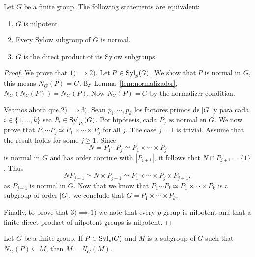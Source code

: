 \begin{theorem}
	\label{thm:nilpotente:eq}
	Let $G$ be a finite group. The following statements are equivalent: 
	\begin{enumerate}
		\item $G$ is nilpotent.
		\item Every Sylow subgroup of $G$ is normal.
		\item $G$ is the direct product of its Sylow subgroups. 
	\end{enumerate}
\end{theorem}

\begin{proof}
	We prove that $1)\implies 2)$. Let $P\in\mathrm{Syl}_p(G)$. We show that $P$ is normal in $G$, this means 
	$N_G(P)=G$. By Lemma~\ref{lem:normalizador},  
	$N_G(N_G(P))=N_G(P)$. Now  $N_G(P)=G$ by the normalizer condition.

	Veamos ahora que $2)\implies 3)$. Sean $p_1,\cdots,p_k$ los factores
	primos de $|G|$ y para cada $i\in\{1,\dots,k\}$ sea $P_i\in\mathrm{Syl}_{p_i}(G)$.
	Por hipótesis, cada $P_j$ es normal en $G$.
	We now prove that $P_1\cdots P_j\simeq P_1\times\cdots\times P_j$ for all $j$.
	The case $j=1$ is trivial. Assume that the result holds for some 
	$j\geq 1$. Since  
	\[
	N=P_1\cdots P_j\simeq P_1\times\cdots\times P_j
	\]
	is normal in $G$ and has order coprime with $|P_{j+1}|$, it follows that $N\cap
	P_{j+1}=\{1\}$. Thus 
	\[
		NP_{j+1}\simeq N\times P_{j+1}\simeq P_1\times\cdots\times P_j\times P_{j+1}, 
	\]
	as $P_{j+1}$ is normal in $G$. 
	Now that we know that $P_1\cdots P_k\simeq P_1\times\cdots\times P_k$ is a subgroup of order 
	$|G|$, we conclude that $G=P_1\times\cdots\times P_k$.

	Finally, to prove that $3)\implies 1)$ we note that every 
	$p$-group is nilpotent and that a finite direct product of nilpotent groups is nilpotent. 
\end{proof}

\begin{exercise}
	\label{xca:truco}
	Let $G$ be a finite group. If $P\in\mathrm{Syl}_p(G)$ and $M$ is a subgroup of $G$ such that 
	$N_G(P)\subseteq M$, then $M=N_G(M)$. 
\end{exercise}


